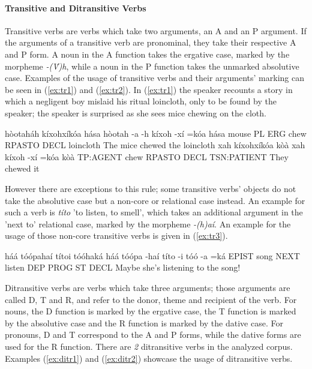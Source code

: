 \documentclass[a4paper, 12pt, oneside]{memoir}
\newcommand{\emh}[1]{\textit{#1}}
\begin{document}
\paragraph{Transitive and Ditransitive Verbs}\label{s:trans}
Transitive verbs are verbs which take two arguments, an A and an P argument. If the arguments of a transitive verb are pronominal, they take their respective A and P form. A noun in the A function takes the ergative case, marked by the morpheme \emh{-(V́)h}, while a noun in the P function takes the unmarked absolutive case. Examples of the usage of transitive verbs and their arguments' marking can be seen in (\ref{ex:tr1}) and (\ref{ex:tr2}). In (\ref{ex:tr1}) the speaker recounts a story in which a negligent boy mislaid his ritual loincloth, only to be found by the speaker; the speaker is surprised as she sees mice chewing on the cloth.
\begin{examples}
    \ex \label{ex:tr1}
    \words hòotaháh kíxohxíkóa hása
    \bits hòotah -a -h kíxoh -xí =kóa hása 
    \gloss mouse PL ERG chew RPASTO DECL loincloth
    \tr The mice chewed the loincloth
    \ex \label{ex:tr2}
    \words xah kíxohxíkóa kòà
    \bits xah kíxoh -xí =kóa kòà
    \gloss TP:AGENT chew RPASTO DECL TSN:PATIENT
    \tr They chewed it
\end{examples} 
However there are exceptions to this rule; some transitive verbs' objects do not take the absolutive case but a non-core or relational case instead. An example for such a verb is \emh{títo} 'to listen, to smell', which takes an additional argument in the 'next to' relational case, marked by the morpheme \emh{-(h)aí}. An example for the usage of those non-core transitive verbs is given in (\ref{ex:tr3}).
\begin{examples}
    \ex \label{ex:tr3}
    \words háá tóópahaí títoi tóóhaká
    \bits háá tóópa -haí títo -i tóó -a =ká 
    \gloss EPIST song NEXT listen DEP PROG ST DECL
    \tr Maybe she's listening to the song!
\end{examples}
Ditransitive verbs are verbs which take three arguments; those arguments are called D, T and R, and refer to the donor, theme and recipient of the verb. For nouns, the D function is marked by the ergative case, the T function is marked by the absolutive case and the R function is marked by the dative case. For pronouns, D and T correspond to the A and P forms, while the dative forms are used for the R function. There are \textit{2} ditransitive verbs in the analyzed corpus. Examples (\ref{ex:ditr1}) and (\ref{ex:ditr2}) showcase the usage of ditransitive verbs. 
\end{document}
